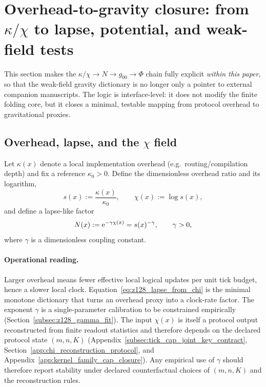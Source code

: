 \section{Overhead-to-gravity closure: from \texorpdfstring{$\kappa/\chi$}{kappa/chi} to lapse, potential, and weak-field tests}
\label{app:overhead_to_gravity_closure}

This section makes the $\kappa/\chi\rightarrow N\rightarrow g_{00}\rightarrow \Phi$ chain fully explicit \emph{within this paper},
so that the weak-field gravity dictionary is no longer only a pointer to external companion manuscripts.
The logic is interface-level: it does not modify the finite folding core, but it closes a minimal, testable mapping from protocol overhead to gravitational proxies.

\subsection{Overhead, lapse, and the \texorpdfstring{$\chi$}{chi} field}
\label{subsec:z128_overhead_lapse}

\begin{definition}
\label{def:z128_overhead_lapse}
Let $\kappa(x)$ denote a local implementation overhead (e.g.\ routing/compilation depth) and fix a reference $\kappa_0>0$.
Define the dimensionless overhead ratio and its logarithm,
\[
s(x):=\frac{\kappa(x)}{\kappa_0},\qquad \chi(x):=\log s(x),
\]
and define a lapse-like factor
\begin{equation}
\label{eq:z128_lapse_from_chi}
N(x):=\mathrm{e}^{-\gamma\chi(x)} = s(x)^{-\gamma},
\qquad \gamma>0,
\end{equation}
where $\gamma$ is a dimensionless coupling constant.
\end{definition}

\paragraph{Operational reading.}
\InterfaceTag Larger overhead means fewer effective local logical updates per unit tick budget, hence a slower local clock.
Equation~\eqref{eq:z128_lapse_from_chi} is the minimal monotone dictionary that turns an overhead proxy into a clock-rate factor.
The exponent $\gamma$ is a single-parameter calibration to be constrained empirically (Section~\ref{subsec:z128_gamma_fit}).
\AuditTag The input $\chi(x)$ is itself a protocol output reconstructed from finite readout statistics and therefore depends on the declared protocol state $(m,n,K)$ (Appendix~\ref{subsec:tick_cap_joint_key_contract}, Section~\ref{app:chi_reconstruction_protocol}, and Appendix~\ref{app:kernel_family_cap_closure}).
Any empirical use of $\gamma$ should therefore report stability under declared counterfactual choices of $(m,n,K)$ and the reconstruction rules.

